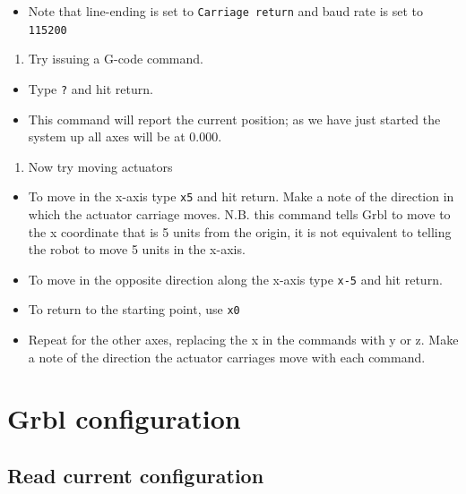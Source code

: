 \documentclass[]{book}
\providecommand{\tightlist}{%
  \setlength{\itemsep}{0pt}\setlength{\parskip}{0pt}}
\theoremstyle{definition}
\theoremstyle{definition}
\theoremstyle{remark}
\begin{document}
\begin{itemize}
\tightlist
\item
  Note that line-ending is set to \texttt{Carriage\ return} and baud
  rate is set to \texttt{115200}
\end{itemize}

\begin{enumerate}
\def\labelenumi{\arabic{enumi}.}
\setcounter{enumi}{1}
\tightlist
\item
  Try issuing a G-code command.
\end{enumerate}

\begin{itemize}
\tightlist
\item
  Type \texttt{?} and hit return.
\item
  This command will report the current position; as we have just started
  the system up all axes will be at 0.000.
\end{itemize}

\begin{enumerate}
\def\labelenumi{\arabic{enumi}.}
\setcounter{enumi}{2}
\tightlist
\item
  Now try moving actuators
\end{enumerate}

\begin{itemize}
\tightlist
\item
  To move in the x-axis type \texttt{x5} and hit return. Make a note of
  the direction in which the actuator carriage moves. N.B. this command
  tells Grbl to move to the x coordinate that is 5 units from the
  origin, it is not equivalent to telling the robot to move 5 units in
  the x-axis.
\item
  To move in the opposite direction along the x-axis type \texttt{x-5}
  and hit return.
\item
  To return to the starting point, use \texttt{x0}
\item
  Repeat for the other axes, replacing the x in the commands with y or
  z. Make a note of the direction the actuator carriages move with each
  command.
\end{itemize}

\section{Grbl configuration}\label{grbl-configuration}

\subsection{Read current
configuration}\label{read-current-configuration}
\end{document}

